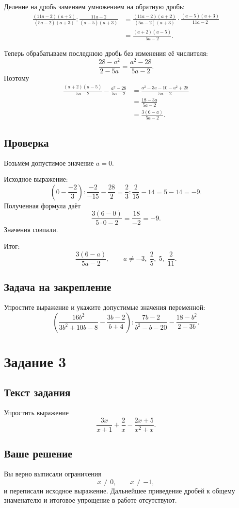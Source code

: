 \documentclass[12pt,a4paper]{article}
\begin{document}
Деление на дробь заменяем умножением на обратную дробь:
\begin{align*}
\frac{(11a-2)(a+2)}{(5a-2)(a+3)}
:
\frac{11a-2}{(a-5)(a+3)}
&=
\frac{(11a-2)(a+2)}{(5a-2)(a+3)}
\cdot
\frac{(a-5)(a+3)}{11a-2}\\
&=
\frac{(a+2)(a-5)}{5a-2}.
\end{align*}

Теперь обрабатываем последнюю дробь без изменения её числителя:
\[
\frac{28-a^2}{2-5a}
=
\frac{a^2-28}{5a-2}.
\]
Поэтому
\begin{align*}
\frac{(a+2)(a-5)}{5a-2}
-
\frac{a^2-28}{5a-2}
&=
\frac{a^2-3a-10-a^2+28}{5a-2}\\
&=
\frac{18-3a}{5a-2}\\
&=
\frac{3(6-a)}{5a-2}.
\end{align*}

\subsection*{Проверка}
Возьмём допустимое значение $a=0$.

Исходное выражение:
\[
\left(0-\frac{-2}{3}\right):\frac{-2}{-15}-\frac{28}{2}
=
\frac23:\frac{2}{15}-14
=
5-14
=-9.
\]
Полученная формула даёт
\[
\frac{3(6-0)}{5\cdot0-2}
=
\frac{18}{-2}
=-9.
\]
Значения совпали.

\textcolor{teal!60!black}{Итог:}
\[
\boxed{\displaystyle \frac{3(6-a)}{5a-2}},
\qquad
 a\ne -3,\;\frac25,\;5,\;\frac{2}{11}.
\]

\subsection*{Задача на закрепление}
Упростите выражение и укажите допустимые значения переменной:
\[
\left(
\frac{16b^2}{3b^2+10b-8}
-
\frac{3b-2}{b+4}
\right)
:
\frac{7b-2}{b^2-b-20}
-
\frac{18-b^2}{2-3b}.
\]

\newpage
{}\label{task:3}
\section*{Задание 3}

\subsection*{Текст задания}
Упростить выражение
\[
\frac{3x}{x+1}
+
\frac{2}{x}
-
\frac{2x+5}{x^2+x}.
\]

\subsection*{Ваше решение}
Вы верно выписали ограничения
\[
x\ne0,
\qquad
x\ne-1,
\]
и переписали исходное выражение. Дальнейшее приведение дробей к общему знаменателю и итоговое упрощение в работе отсутствуют.
\end{document}
